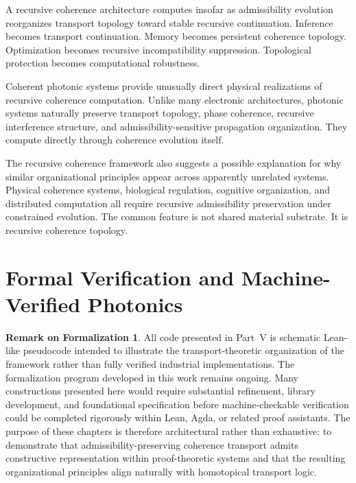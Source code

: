 \documentclass[11pt,openany]{book}
\theoremstyle{definition}
\newtheorem*{remark*}{Remark on Formalization}
\theoremstyle{plain}
\begin{document}
A recursive coherence architecture computes insofar as admissibility evolution reorganizes transport topology toward stable recursive continuation. Inference becomes transport continuation. Memory becomes persistent coherence topology. Optimization becomes recursive incompatibility suppression. Topological protection becomes computational robustness.

Coherent photonic systems provide unusually direct physical realizations of recursive coherence computation. Unlike many electronic architectures, photonic systems naturally preserve transport topology, phase coherence, recursive interference structure, and admissibility-sensitive propagation organization. They compute directly through coherence evolution itself.

The recursive coherence framework also suggests a possible explanation for why similar organizational principles appear across apparently unrelated systems. Physical coherence systems, biological regulation, cognitive organization, and distributed computation all require recursive admissibility preservation under constrained evolution. The common feature is not shared material substrate. It is recursive coherence topology.


\part{Formal Verification and Machine-Verified Photonics}

\begin{remark*}
All code presented in Part~V is schematic Lean-like pseudocode intended to illustrate the transport-theoretic organization of the framework rather than fully verified industrial implementations. The formalization program developed in this work remains ongoing. Many constructions presented here would require substantial refinement, library development, and foundational specification before machine-checkable verification could be completed rigorously within Lean, Agda, or related proof assistants. The purpose of these chapters is therefore architectural rather than exhaustive: to demonstrate that admissibility-preserving coherence transport admits constructive representation within proof-theoretic systems and that the resulting organizational principles align naturally with homotopical transport logic.
\end{remark*}
\end{document}
